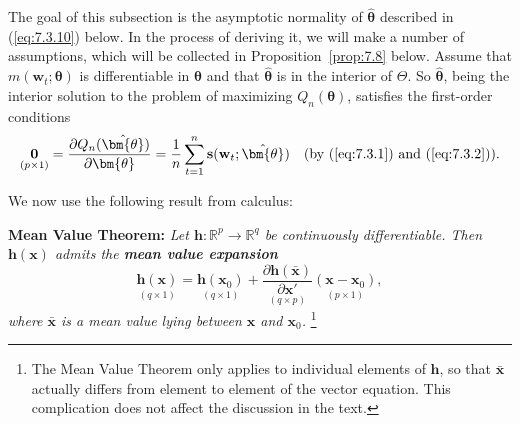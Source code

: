 The goal of this subsection is the asymptotic normality of $\hat{\bm{\theta}}$ described in (\ref{eq:7.3.10}) below. In the process of deriving it, we will make a number of assumptions, which will be collected in Proposition~\ref{prop:7.8} below. Assume that $m(\mathbf{w}_t; \bm{\theta})$ is differentiable in $\bm{\theta}$ and that $\hat{\bm{\theta}}$ is in the interior of $\Theta$. So $\hat{\bm{\theta}}$, being the interior solution to the problem of maximizing $Q_n(\bm{\theta})$, satisfies the first-order conditions
\begin{equation}
\label{eq:7.3.4}
\underset{(p \times 1)}{\mathbf{0}} = \frac{\partial Q_n(\hat{\bm{\theta}})}{\partial \bm{\theta}} = \frac{1}{n} \sum_{t=1}^{n} \mathbf{s}(\mathbf{w}_t; \hat{\bm{\theta}}) \quad (\text{by } (\ref{eq:7.3.1}) \text{ and } (\ref{eq:7.3.2})).
\end{equation}

We now use the following result from calculus:

\medskip
\noindent\textbf{Mean Value Theorem:} \emph{Let $\mathbf{h} : \mathbb{R}^p \to \mathbb{R}^q$ be continuously differentiable. Then $\mathbf{h}(\mathbf{x})$ admits the \textbf{mean value expansion}}
\[
\underset{(q \times 1)}{\mathbf{h}(\mathbf{x})} = \underset{(q \times 1)}{\mathbf{h}(\mathbf{x}_0)} + \underset{(q \times p)}{\frac{\partial \mathbf{h}(\bar{\mathbf{x}})}{\partial \mathbf{x}'}} \underset{(p \times 1)}{(\mathbf{x} - \mathbf{x}_0)},
\]
\emph{where $\bar{\mathbf{x}}$ is a mean value lying between $\mathbf{x}$ and $\mathbf{x}_0$.}%
\footnote{The Mean Value Theorem only applies to individual elements of $\mathbf{h}$, so that $\bar{\mathbf{x}}$ actually differs from element to element of the vector equation. This complication does not affect the discussion in the text.}

